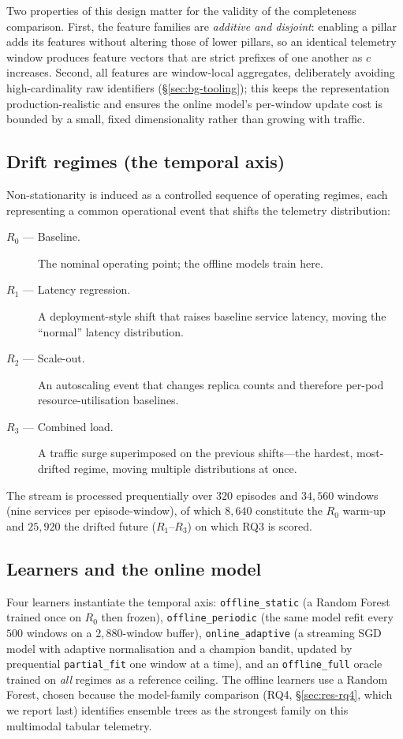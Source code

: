 \documentclass[pdflatex,sn-mathphys-num]{sn-jnl}%
\theoremstyle{thmstyleone}%
\theoremstyle{thmstyletwo}%
\theoremstyle{thmstylethree}%
\begin{document}
Two properties of this design matter for the validity of the completeness comparison. First, the feature families are \emph{additive and disjoint}: enabling a pillar adds its features without altering those of lower pillars, so an identical telemetry window produces feature vectors that are strict prefixes of one another as $c$ increases. Second, all features are window-local aggregates, deliberately avoiding high-cardinality raw identifiers (\S\ref{sec:bg-tooling}); this keeps the representation production-realistic and ensures the online model's per-window update cost is bounded by a small, fixed dimensionality rather than growing with traffic.

\subsection{Drift regimes (the temporal axis)}\label{sec:method-regimes}

Non-stationarity is induced as a controlled sequence of operating regimes, each representing a common operational event that shifts the telemetry distribution:
\begin{description}
  \item[$R_0$ --- Baseline.] The nominal operating point; the offline models train here.
  \item[$R_1$ --- Latency regression.] A deployment-style shift that raises baseline service latency, moving the ``normal'' latency distribution.
  \item[$R_2$ --- Scale-out.] An autoscaling event that changes replica counts and therefore per-pod resource-utilisation baselines.
  \item[$R_3$ --- Combined load.] A traffic surge superimposed on the previous shifts---the hardest, most-drifted regime, moving multiple distributions at once.
\end{description}
The stream is processed prequentially over $320$ episodes and $34{,}560$ windows (nine services per episode-window), of which $8{,}640$ constitute the $R_0$ warm-up and $25{,}920$ the drifted future ($R_1$--$R_3$) on which RQ3 is scored.

\subsection{Learners and the online model}\label{sec:method-learners}

Four learners instantiate the temporal axis: \texttt{offline\_static} (a Random Forest trained once on $R_0$ then frozen), \texttt{offline\_periodic} (the same model refit every $500$ windows on a $2{,}880$-window buffer), \texttt{online\_adaptive} (a streaming SGD model with adaptive normalisation and a champion bandit, updated by prequential \texttt{partial\_fit} one window at a time), and an \texttt{offline\_full} oracle trained on \emph{all} regimes as a reference ceiling. The offline learners use a Random Forest, chosen because the model-family comparison (RQ4, \S\ref{sec:res-rq4}, which we report last) identifies ensemble trees as the strongest family on this multimodal tabular telemetry.
\end{document}
